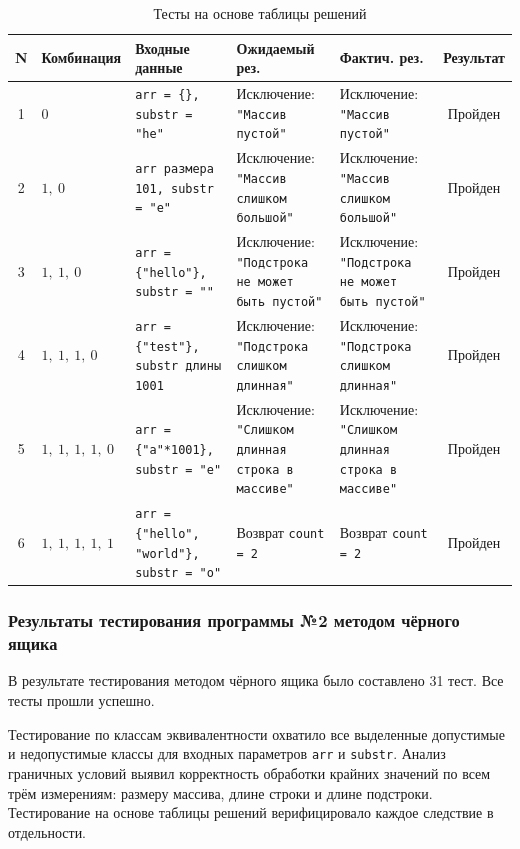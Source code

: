 \documentclass{article}[14pt]
\begin{document}
\begin{table}[H]
\centering
\caption{Тесты на основе таблицы решений}
\renewcommand{\arraystretch}{1.5}
\begin{tabular}{|c|p{3cm}|p{3cm}|p{3cm}|p{3cm}|c|}
\hline
\textbf{N} & \textbf{Комбинация} & \textbf{Входные данные} & \textbf{Ожидаемый рез.} & \textbf{Фактич. рез.} & \textbf{Результат} \\
\hline
1 & $0$ & \texttt{arr = \{\}, substr = "he"} & Исключение: \texttt{"Массив пустой"} & Исключение: \texttt{"Массив пустой"} & Пройден \\
\hline
2 & $1,\ 0$ & \texttt{arr размера 101, substr = "e"} & Исключение: \texttt{"Массив слишком большой"} & Исключение: \texttt{"Массив слишком большой"} & Пройден \\
\hline
3 & $1,\ 1,\ 0$ & \texttt{arr = \{"hello"\}, substr = ""} & Исключение: \texttt{"Подстрока не может быть пустой"} & Исключение: \texttt{"Подстрока не может быть пустой"} & Пройден \\
\hline
4 & $1,\ 1,\ 1,\ 0$ & \texttt{arr = \{"test"\}, substr длины 1001} & Исключение: \texttt{"Подстрока слишком длинная"} & Исключение: \texttt{"Подстрока слишком длинная"} & Пройден \\
\hline
5 & $1,\ 1,\ 1,\ 1,\ 0$ & \texttt{arr = \{"a"*1001\}, substr = "e"} & Исключение: \texttt{"Слишком длинная строка в массиве"} & Исключение: \texttt{"Слишком длинная строка в массиве"} & Пройден \\
\hline
6 & $1,\ 1,\ 1,\ 1,\ 1$ & \texttt{arr = \{"hello", "world"\}, substr = "o"} & Возврат \texttt{count = 2} & Возврат \texttt{count = 2} & Пройден \\
\hline
\end{tabular}
\end{table}


\subsubsection{Результаты тестирования программы №2 методом чёрного ящика}

В результате тестирования методом чёрного ящика было составлено 31 тест.
Все тесты прошли успешно.

Тестирование по классам эквивалентности охватило все выделенные допустимые и недопустимые классы
для входных параметров \texttt{arr} и \texttt{substr}. Анализ граничных условий выявил корректность
обработки крайних значений по всем трём измерениям: размеру массива, длине строки и длине подстроки.
Тестирование на основе таблицы решений верифицировало каждое следствие в отдельности.
\end{document}
